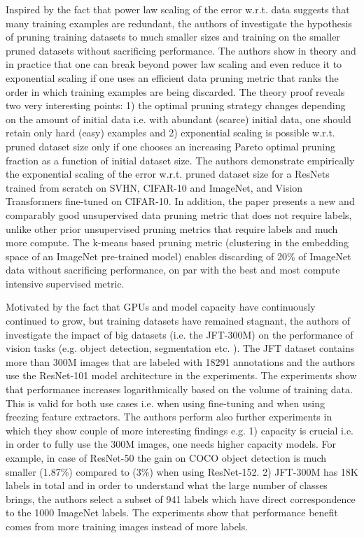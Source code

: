\documentclass{article} %
\begin{document}
Inspired by the fact that power law scaling of the error w.r.t. data suggests that many training examples are redundant, the authors of \cite{sorscher2023neural} investigate the hypothesis of pruning training datasets to much smaller sizes and training on the smaller pruned datasets without sacrificing performance. The authors show in theory and in practice that one can break beyond power law scaling and even reduce it to exponential scaling if one uses an efficient data pruning metric that ranks the order in which training examples are being discarded. The theory proof reveals two very interesting points: 1) the optimal pruning strategy changes depending on the amount of initial data i.e. with abundant (scarce) initial data, one should retain only hard (easy) examples and 2) exponential scaling is possible w.r.t. pruned dataset size only if one chooses an increasing Pareto optimal pruning fraction as a function of initial dataset size. The authors demonstrate empirically the exponential scaling of the error w.r.t. pruned dataset size for a ResNets trained from scratch on SVHN, CIFAR-10 and ImageNet, and Vision Transformers fine-tuned on CIFAR-10. In addition, the paper presents a new and comparably good unsupervised data pruning metric that does not require labels, unlike other prior unsupervised pruning metrics that require labels and much more compute. The k-means based pruning metric (clustering in the embedding space of an ImageNet pre-trained model) enables discarding of 20\% of ImageNet data without sacrificing performance, on par with the best and most compute intensive supervised metric.

Motivated by the fact that GPUs and model capacity have continuously continued to grow, but training datasets have remained stagnant, the authors of \cite{sun2017revisiting} investigate the impact of big datasets (i.e. the JFT-300M) on the performance of vision tasks (e.g. object detection, segmentation etc. ). The JFT dataset contains more than 300M images that are labeled with 18291 annotations and the authors use the ResNet-101 model architecture in the experiments. The experiments show that performance increases logarithmically based on the volume of training data. This is valid for both use cases i.e. when using fine-tuning and when using freezing feature extractors. The authors perform also further experiments in which they show couple of more interesting findings e.g. 1) capacity is crucial i.e. in order to fully use the 300M images, one needs higher capacity models. For example, in case of ResNet-50 the gain on COCO object detection is much smaller (1.87\%) compared to (3\%) when using ResNet-152. 2) JFT-300M has 18K labels in total and in order to understand what the large number of classes brings, the authors select a subset of 941 labels which have direct correspondence to the 1000 ImageNet labels. The experiments show that performance benefit comes from more training images instead of more labels.
\end{document}
